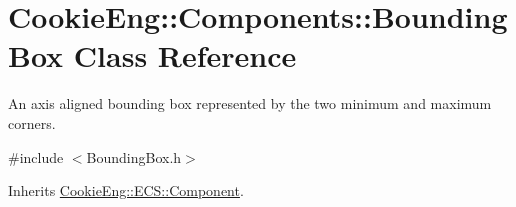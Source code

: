 \hypertarget{class_cookie_eng_1_1_components_1_1_bounding_box}{}\section{Cookie\+Eng\+:\+:Components\+:\+:Bounding\+Box Class Reference}
\label{class_cookie_eng_1_1_components_1_1_bounding_box}


An axis aligned bounding box represented by the two minimum and maximum corners.  




{\ttfamily \#include $<$Bounding\+Box.\+h$>$}



Inherits \hyperlink{class_cookie_eng_1_1_e_c_s_1_1_component}{Cookie\+Eng\+::\+E\+C\+S\+::\+Component}.


